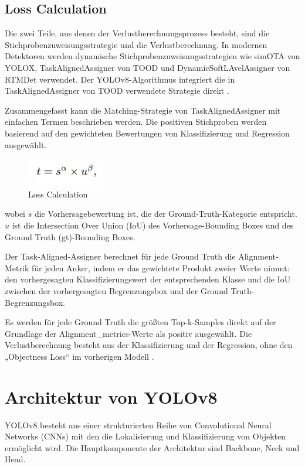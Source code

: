\documentclass[a4paper,12pt]{article}
\begin{document}
\subsection{Loss Calculation}
Die zwei Teile, aus denen der Verlustberechnungsprozess besteht, sind die Stichprobenzuweisungsstrategie und die Verlustberechnung. In modernen Detektoren werden dynamische Stichprobenzuweisungsstrategien wie simOTA von YOLOX, TaskAlignedAssigner von TOOD und DynamicSoftLAvelAssigner von RTMDet verwendet. Der YOLOv8-Algorithmus integriert die in TaskAlignedAssigner von TOOD verwendete Strategie direkt \cite{yolov8_architecture}.

\noindent Zusammengefasst kann die Matching-Strategie von TaskAlignedAssigner mit einfachen Termen beschrieben werden. Die positiven Stichproben werden basierend auf den gewichteten Bewertungen von Klassifizierung und Regression ausgewählt.

\begin{figure}[h]
    \centering
    \includegraphics[width=0.3\textwidth]{Bild5.png}
    \caption{Loss Calculation}
    \label{fig:bild5}
\end{figure}

\noindent wobei $s$ die Vorhersagebewertung ist, die der Ground-Truth-Kategorie entspricht. $u$ ist die Intersection Over Union (IoU) des Vorhersage-Bounding Boxes und des Ground Truth (gt)-Bounding Boxes.

\noindent Der Task-Aligned-Assigner berechnet für jede Ground Truth die Alignment-Metrik für jeden Anker, indem er das gewichtete Produkt zweier Werte nimmt: den vorhergesagten Klassifizierungswert der entsprechenden Klasse und die IoU zwischen der vorhergesagten Begrenzungsbox und der Ground Truth-Begrenzungsbox.

\noindent Es werden für jede Ground Truth die größten Top-k-Samples direkt auf der Grundlage der Alignment\_metrics-Werte als positiv ausgewählt. Die Verlustberechnung besteht aus der Klassifizierung und der Regression, ohne den „Objectness Loss“ im vorherigen Modell \cite{openmmlab2023dive}.


\section{Architektur von YOLOv8}
YOLOv8 besteht aus einer strukturierten Reihe von Convolutional Neural Networks (CNNs) mit den die Lokalisierung und Klassifizierung von Objekten ermöglicht wird. Die Hauptkomponente der Architektur sind Backbone, Neck und Head.
\end{document}

